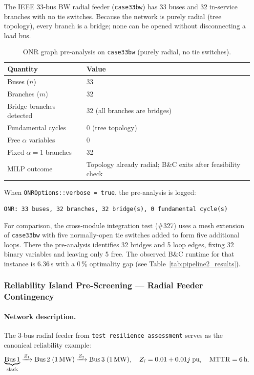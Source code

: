The IEEE 33-bus BW radial feeder (\texttt{case33bw}) has 33 buses and 32
in-service branches with no tie switches.  Because the network is purely
radial (tree topology), every branch is a bridge; none can be opened without
disconnecting a load bus.

\begin{table}[ht]
\centering
\caption{ONR graph pre-analysis on \texttt{case33bw} (purely radial, no tie switches).}
\label{tab:onr_bridge_33bw}
\begin{tabular}{ll}
\hline
\textbf{Quantity} & \textbf{Value} \\
\hline
Buses ($n$)                        & 33 \\
Branches ($m$)                     & 32 \\
Bridge branches detected           & 32 (all branches are bridges) \\
Fundamental cycles                 & 0 (tree topology) \\
Free $\alpha$ variables            & 0 \\
Fixed $\alpha = 1$ branches        & 32 \\
MILP outcome                       & Topology already radial; B\&C exits after feasibility check \\
\hline
\end{tabular}
\end{table}

When \texttt{ONROptions::verbose = true}, the pre-analysis is logged:

\begin{verbatim}
ONR: 33 buses, 32 branches, 32 bridge(s), 0 fundamental cycle(s)
\end{verbatim}

For comparison, the cross-module integration test (\#327) uses a mesh
extension of \texttt{case33bw} with five normally-open tie switches added to
form five additional loops.  There the pre-analysis identifies 32 bridges and
5 loop edges, fixing 32 binary variables and leaving only 5 free.  The
observed B\&C runtime for that instance is 6.36\,s with a 0\,\% optimality
gap (see Table~\ref{tab:pipeline2_results}).

\subsubsection{Reliability Island Pre-Screening --- Radial Feeder Contingency}

\paragraph{Network description.}
The 3-bus radial feeder from \texttt{test\_resilience\_assessment} serves as
the canonical reliability example:
\[
  \underbrace{\text{Bus\,1}}_{\text{slack}}
  \xrightarrow{Z_1}\text{Bus\,2}\;(1\,\text{MW})
  \xrightarrow{Z_2}\text{Bus\,3}\;(1\,\text{MW}),
  \quad Z_i = 0.01 + 0.01j\;\text{pu}, \quad \text{MTTR} = 6\,\text{h}.
\]

